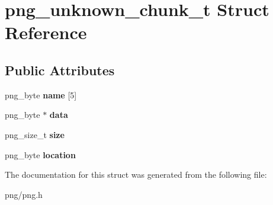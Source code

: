 \hypertarget{structpng__unknown__chunk__t}{}\section{png\+\_\+unknown\+\_\+chunk\+\_\+t Struct Reference}
\label{structpng__unknown__chunk__t}
\subsection*{Public Attributes}
\begin{DoxyCompactItemize}
\item 
png\+\_\+byte {\bfseries name} \mbox{[}5\mbox{]}\hypertarget{structpng__unknown__chunk__t_aed965186b30a6f15541d20d7dd8a6849}{}\label{structpng__unknown__chunk__t_aed965186b30a6f15541d20d7dd8a6849}

\item 
png\+\_\+byte $\ast$ {\bfseries data}\hypertarget{structpng__unknown__chunk__t_a4f37f6acbe4e2c287078bcdf03d8ee92}{}\label{structpng__unknown__chunk__t_a4f37f6acbe4e2c287078bcdf03d8ee92}

\item 
png\+\_\+size\+\_\+t {\bfseries size}\hypertarget{structpng__unknown__chunk__t_a0a691245e0c04f01ecf767f215b6a652}{}\label{structpng__unknown__chunk__t_a0a691245e0c04f01ecf767f215b6a652}

\item 
png\+\_\+byte {\bfseries location}\hypertarget{structpng__unknown__chunk__t_af56bfc32223b97fbcb6bd29ba7a1cc29}{}\label{structpng__unknown__chunk__t_af56bfc32223b97fbcb6bd29ba7a1cc29}

\end{DoxyCompactItemize}


The documentation for this struct was generated from the following file\+:\begin{DoxyCompactItemize}
\item 
png/png.\+h\end{DoxyCompactItemize}

